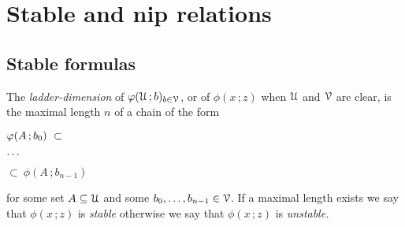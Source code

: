 \documentclass[scombinatorics.tex]{subfiles}
\begin{document}
\chapter{Stable and {\sc nip} relations}
\label{sauer}



\def\medrel#1{\parbox[t]{5ex}{$\displaystyle\hfil #1$}}
\def\ceq#1#2#3{\parbox[t]{20ex}{$\displaystyle #1$}\medrel{#2}{$\displaystyle #3$}}


\section{Stable formulas}\label{VCdim}

The \emph{ladder-dimension\/} of $\varphi(\EuScript U\,;b)_{b\in\EuScript V}$, or of $\phi(x\,;z)$ when $\EuScript U$ and $\EuScript V$ are clear, is the maximal length $n$ of a chain of the form

\ceq{\hfill\phi(A\,;b_0)\ \subset}{\dots}{\subset\ \phi(A\,;b_{n-1})}
 
for some set $A\subseteq\EuScript U$ and some $b_0,\dots,b_{n-1}\in\EuScript V$. If a maximal length exists we say that  $\phi(x\,;z)$ is \emph{stable\/} otherwise we say that $\phi(x\,;z)$ is \emph{unstable.}


  
  
 
  
  
  
  
\end{document}

